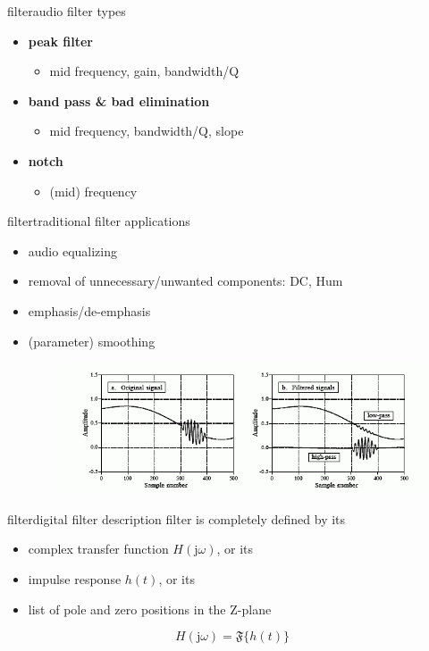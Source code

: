 \begin{frame}{filter}{audio filter types}
{\begin{itemize}
					\begin{itemize}
						\item	cut-off frequency, gain
					\end{itemize}
				\item	\textbf{peak filter}
					\begin{itemize}
						\item	mid frequency, gain, bandwidth/Q
					\end{itemize}
				\item	\textbf{band pass \& bad elimination}
					\begin{itemize}
						\item	mid frequency, bandwidth/Q, slope
					\end{itemize}
				\item	\textbf{notch}
					\begin{itemize}
						\item	(mid) frequency
					\end{itemize}
			\end{itemize}
		}
	\end{frame}
	\begin{frame}{filter}{traditional filter applications}
		\begin{itemize}
			\item	audio equalizing
			\pause
			\item	removal of unnecessary/unwanted components: DC, Hum
			\pause
			\item	emphasis/de-emphasis
			\pause
			\item	(parameter) smoothing
				\begin{figure}
					\centerline{\includegraphics[scale=.6]{graph/parameter_smoothing}}
				    \label{fig:parameter_smoothing}
				\end{figure}
		\end{itemize}
	\end{frame}
	
	\begin{frame}{filter}{digital filter description}
		filter is completely defined by its
		\begin{itemize}
			\item	complex transfer function $H(\mathrm{j}\omega)$, or its
			\item	impulse response $h(t)$, or its
			\item	list of pole and zero positions in the Z-plane
		\end{itemize}
		\pause
		\begin{equation}
			H(\mathrm{j}\omega) = \mathfrak{F}\{h(t)\}
		\end{equation}
	\end{frame}


